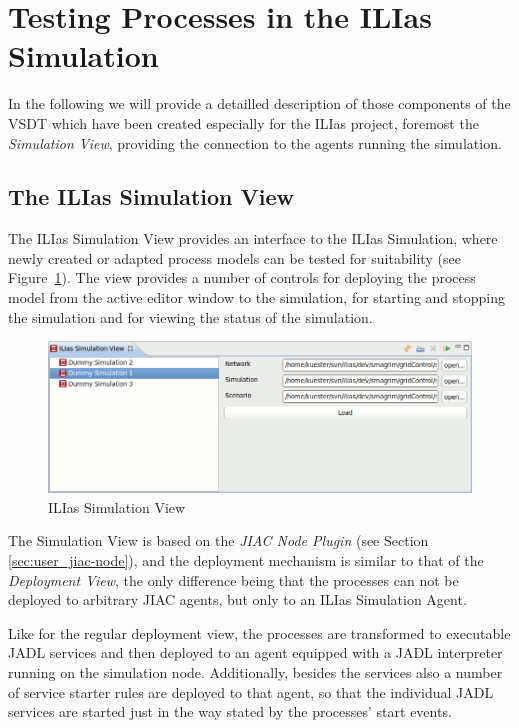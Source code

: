 \section{Testing Processes in the ILIas Simulation}

In the following we will provide a detailled description of those components of
the VSDT which have been created especially for the ILIas project, foremost the
\emph{Simulation View}, providing the connection to the agents running the
simulation.


\subsection{The ILIas Simulation View}

The ILIas Simulation View provides an interface to the ILIas Simulation, where
newly created or adapted process models can be tested for suitability (see
Figure~\ref{fig:ilias-simview}).  The view provides a number of controls for
deploying the process model from the active editor window to the simulation, for
starting and stopping the simulation and for viewing the status of the simulation.

\begin{figure}[ht]
	\centering
	\includegraphics[width=.6\textwidth]{ilias/ilias-view_110720.png}
	\caption{ILIas Simulation View}
	\label{fig:ilias-simview}
\end{figure}

The Simulation View is based on the \emph{JIAC Node Plugin} (see Section
\ref{sec:user_jiac-node}), and the deployment mechanism is similar to that of the
\emph{Deployment View}, the only difference being that the processes can not be
deployed to arbitrary JIAC agents, but only to an ILIas Simulation Agent.

Like for the regular deployment view, the processes are transformed to executable
JADL services and then deployed to an agent equipped with a JADL interpreter
running on the simulation node.  Additionally, besides the services also a number of
service starter rules are deployed to that agent, so that the individual JADL
services are started just in the way stated by the processes' start events.


